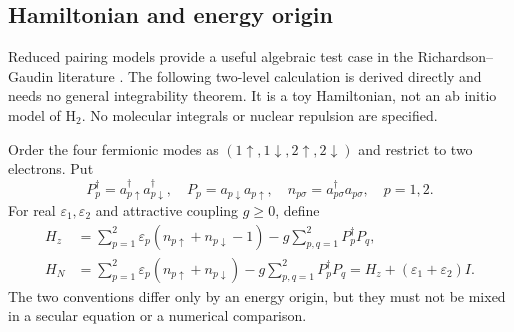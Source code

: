 \subsection{Hamiltonian and energy origin}
Reduced pairing models provide a useful algebraic test case in the
Richardson--Gaudin literature \citep{Richardson1963,Dukelsky2004}.
The following two-level calculation is derived directly and needs no general
integrability theorem. It is a toy Hamiltonian, not an ab initio model of
$\mathrm H_2$. No molecular integrals or nuclear repulsion are specified.

Order the four fermionic modes as
$(1\uparrow,1\downarrow,2\uparrow,2\downarrow)$ and restrict to two
electrons. Put
\[
 P_p^\dagger=a_{p\uparrow}^\dagger a_{p\downarrow}^\dagger,
 \quad P_p=a_{p\downarrow}a_{p\uparrow},\quad
 n_{p\sigma}=a_{p\sigma}^\dagger a_{p\sigma},\quad p=1,2.
\]
For real $\varepsilon_1,\varepsilon_2$ and attractive coupling $g\ge0$,
define
\begin{align}
 H_z&=\sum_{p=1}^2\varepsilon_p
       (n_{p\uparrow}+n_{p\downarrow}-1)
       -g\sum_{p,q=1}^2P_p^\dagger P_q,
       \label{eq:pair-z}\\
 H_N&=\sum_{p=1}^2\varepsilon_p
       (n_{p\uparrow}+n_{p\downarrow})
       -g\sum_{p,q=1}^2P_p^\dagger P_q
     =H_z+(\varepsilon_1+\varepsilon_2)I.
       \label{eq:pair-n}
\end{align}
The two conventions differ only by an energy origin, but they must not be
mixed in a secular equation or a numerical comparison.


